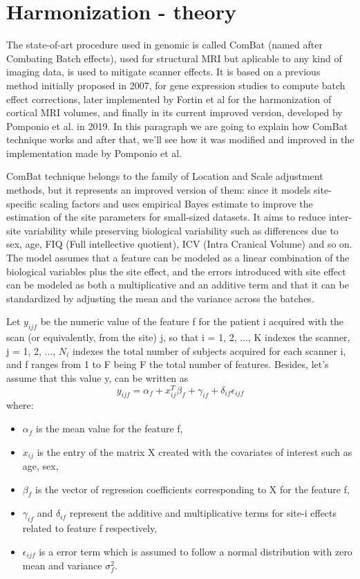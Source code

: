 \documentclass[11pt]{report}
\begin{document}
\section{Harmonization - theory}\label{sec:harmonizationtheory}


The state-of-art procedure used in genomic is called ComBat (named after Combating Batch effects), used for structural MRI but aplicable to any kind of imaging data, is used to mitigate scanner effects.
It is based on a previous method initially proposed in 2007, for gene expression studies to compute batch effect corrections, later implemented by Fortin et al \cite{fortin-2018} for the harmonization of cortical MRI volumes, and finally in its current improved version, developed by Pomponio et al. \cite{pomponio-2019} in 2019.
In this paragraph we are going to explain how ComBat technique works and after that, we'll see how it was modified and improved in the implementation made by Pomponio et al.

ComBat technique belongs to the family of Location and Scale adjustment methods, but it represents an improved version of them: since it models site-specific scaling factors and uses empirical Bayes estimate to improve the estimation of the site parameters for small-sized datasets.\cite{fortin-2018}
It aims to reduce inter-site variability while preserving biological variability such as differences due to sex, age, FIQ (Full intellective quotient), ICV (Intra Cranical Volume) and so on.
The model assumes that a feature can be modeled as a linear combination of the biological variables plus the site effect, and the errors introduced with site effect can be modeled as both a multiplicative and an additive term and that it can be standardized by adjusting the mean and the variance across the batches.

Let $y_{ijf}$ be the numeric value of the feature f for the patient i acquired with the scan (or equivalently, from the site) j, so that i = 1, 2, ..., K indexes the scanner, j = 1, 2, ..., $N_i$ indexes the total number of subjects acquired for each scanner i, and f ranges from 1 to F being F the total number of features. Besides, let's assume that this value y, can be written as
\begin{equation}
y_{ijf} = \alpha_f + x_{ij}^T \beta _f + \gamma_{if} + \delta_{if} \epsilon_{ijf}
\end{equation}
where:
\begin{itemize}
\item $\alpha_f$ is the mean value for the feature f,
\item $x_{ij}$ is the entry of the matrix X created with the covariates of interest such as age, sex,
\item $\beta_f$ is the vector of regression coefficients corresponding to X for the feature f,
\item $\gamma_{if}$ and $\delta_{if}$ represent the additive and multiplicative terms for site-i effects related to feature f respectively,
\item $\epsilon_{ijf}$ is a error term which is assumed to follow a normal distribution with zero mean and variance $\sigma_f^2$.
\end{itemize}
\end{document}
